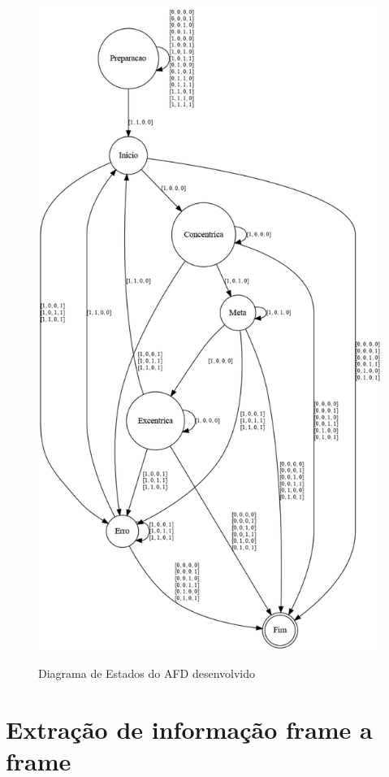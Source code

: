 \begin{figure}[H]
	\centering
	\caption{Diagrama de Estados do AFD desenvolvido}
	\includegraphics[scale=0.4]{figuras/AFD/afd_barra.png}
	\label{fig:transicaoAFD}
\end{figure}


\section[Extração de informação frame a frame]{Extração de informação frame a frame}\label{sec:Extracao de informacao frame a frame}

